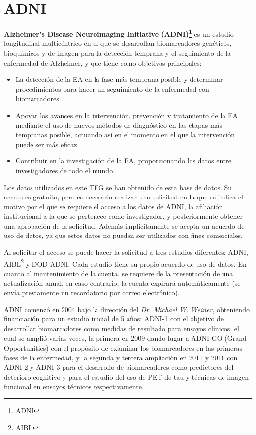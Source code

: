 \chapter{ADNI}\label{ch:aped.a}
\textbf{Alzheimer’s Disease Neuroimaging Initiative (ADNI)\footnote{\href{https://adni.loni.usc.edu/}{ADNI}}} es un
estudio longitudinal multicéntrico en el que se desarrollan biomarcadores genéticos, bioquímicos y de imagen para la
detección temprana y el seguimiento de la enfermedad de Alzheimer, y que tiene como objetivos principales:
\begin{itemize}
    \item La detección de la EA en la fase más temprana posible y determinar procedimientos para hacer un seguimiento
    de la enfermedad con biomarcadores.
    \item Apoyar los avances en la intervención, prevención y tratamiento de la EA mediante el uso de nuevos métodos de
    diagnóstico en las etapas más tempranas posible, actuando así en el momento en el que la intervención puede ser más eficaz.
    \item Contribuir en la investigación de la EA, proporcionando los datos entre investigadores de todo el mundo.\\
\end{itemize}

Los datos utilizados en este TFG se han obtenido de esta base de datos.
Su acceso es gratuito, pero es necesario realizar una solicitud en la que se indica el motivo por el que se requiere el
acceso a los datos de ADNI, la afiliación institucional a la que se pertenece como investigador, y posteriormente
obtener una aprobación de la solicitud.
Además implícitamente se acepta un acuerdo de uso de datos, ya que estos datos no pueden ser utilizados con fines comerciales.

Al solicitar el acceso se puede hacer la solicitud a tres estudios diferentes: ADNI,
AIBL\footnote{\href{https://aibl.csiro.au/}{AIBL}} y DOD-ADNI. Cada estudio tiene su propio acuerdo de uso de datos.
En cuanto al mantenimiento de la cuenta, se requiere de la presentación de una actualización anual, en caso contrario,
la cuenta expirará automáticamente (se envía previamente un recordatorio por correo electrónico).

ADNI comenzó en 2004 bajo la dirección del \textit{Dr. Michael W. Weiner}, obteniendo financiación para un estudio
inicial de 5 años: ADNI-1 con el objetivo de desarrollar biomarcadores como medidas de resultado para ensayos clínicos,
el cual se amplió varias veces, la primera en 2009 dando lugar a ADNI-GO (Grand Opportunities) con el propósito de
examinar los biomarcadores en las primeras fases de la enfermedad, y la segunda y tercera ampliación en 2011 y 2016 con
ADNI-2 y ADNI-3 para el desarrollo de biomarcadores como predictores del deterioro cognitivo y para el estudio del uso
de PET de tau y técnicas de imagen funcional en ensayos técnicos respectivamente.

